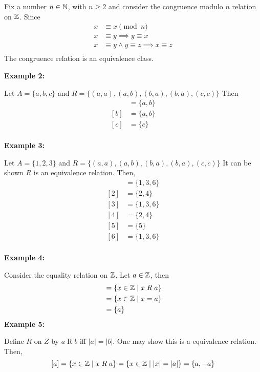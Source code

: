 \documentclass{article}
\begin{document}
  \begin{examples}
    Fix a number $n \in \mathbb{N}$, with $n\geq 2$ and consider the congruence modulo $n$ relation on $\mathbb{Z}$.
    Since
    \begin{align*}
      x &\equiv x \pmod{n}\\
      x &\equiv y \implies y \equiv x\\
      x &\equiv y \wedge y \equiv z \implies x \equiv z\\
    \end{align*}
    The congruence relation is an equivalence class.

    \textbf{Example 2:}

    Let $A = \{a, b, c\}$ and $R = \{(a, a), (a, b), (b, a), (b, a), (c, c)\}$
    Then
    \begin{align*}
      [a] &= \{a, b\}\\
      [b] &= \{a, b\}\\
      [c] &= \{c\}\\
    \end{align*}

    \textbf{Example 3:}

    Let $A = \{1, 2, 3\}$ and $R = \{(a, a), (a, b), (b, a), (b, a), (c, c)\}$
    It can be shown $R$ is an equivalence relation.
    Then,
    \begin{align*}
      [1] &= \{1, 3, 6\}\\
      [2] &= \{2, 4\}\\
      [3] &= \{1, 3, 6\}\\
      [4] &= \{2, 4\}\\
      [5] &= \{5\}\\
      [6] &= \{1, 3, 6\}\\
    \end{align*}

    \textbf{Example 4:}

    Consider the equality relation on $\mathbb{Z}$. Let $a \in \mathbb{Z}$, then
    \begin{align*}
      [a] &= \{x \in \Z \mid x \mathrel{R} a\}\\
      &= \{x \in \Z \mid x = a\}\\
      &= \{a\}
    \end{align*}
    \textbf{Example 5:}

    Define $R$ on $Z$ by $a \mathrel{R} b$ iff $|a| = |b|$. One may show this is a equivalence relation. Then,
    \[
      [a] = \{x \in \mathbb{Z} \mid x \mathrel{R} a \} = \{x \in \mathbb{Z} \mid |x| = |a|\} = \{a, -a\}
    \]


\end{examples}
\end{document}
